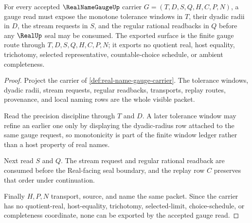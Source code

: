 \begin{theorem}
\label{thm:real-name-gauge-window-obligation}
For every accepted $\RealNameGaugeUp$ carrier $G=(T,D,S,Q,H,C,P,N)$, a gauge read must expose the monotone tolerance windows in $T$, their dyadic radii in $D$, the stream requests in $S$, and the regular rational readbacks in $Q$ before any $\RealUp$ seal may be consumed. The exported surface is the finite gauge route through $T,D,S,Q,H,C,P,N$; it exports no quotient real, host equality, trichotomy, selected representative, countable-choice schedule, or ambient completeness.
\end{theorem}
\begin{proof}
Project the carrier of \autoref{def:real-name-gauge-carrier}. The tolerance windows, dyadic radii, stream requests, regular readbacks, transports, replay routes, provenance, and local naming rows are the whole visible packet.

Read the precision discipline through $T$ and $D$. A later tolerance window may refine an earlier one only by displaying the dyadic-radius row attached to the same gauge request, so monotonicity is part of the finite window ledger rather than a host property of real names.

Next read $S$ and $Q$. The stream request and regular rational readback are consumed before the Real-facing seal boundary, and the replay row $C$ preserves that order under continuation.

Finally $H,P,N$ transport, source, and name the same packet. Since the carrier has no quotient-real, host-equality, trichotomy, selected-limit, choice-schedule, or completeness coordinate, none can be exported by the accepted gauge read.
\end{proof}


\begin{closurestatus}{\RealNameGaugeUp}
  \theoryclosure{\seedClosure}
  \formalstatus{\unformalizedV}
\end{closurestatus}
